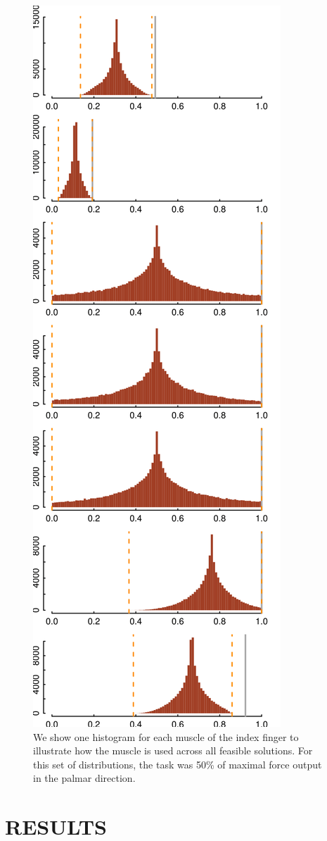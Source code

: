 \begin{figure}[htbp]
\centering
\includegraphics[width=7.5cmh]{sections/figs/raw_histograms.png}
\caption{We show one histogram for each muscle of the index finger to illustrate how the muscle is used across all feasible solutions.
For this set of distributions, the task was 50\% of maximal force output in the palmar direction.}
\label{fig:raw_histograms}
\end{figure}


\section{RESULTS}

